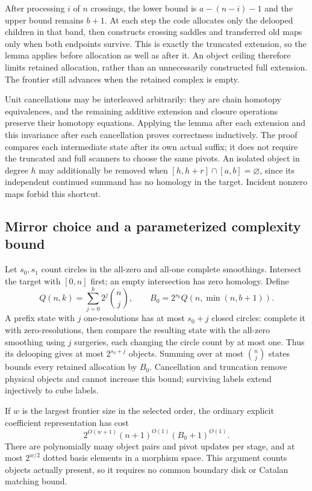 After processing $i$ of $n$ crossings, the lower bound is
$a-(n-i)-1$ and the upper bound remains $b+1$.
At each step the code allocates only the delooped children in that band,
then constructs crossing saddles and transferred old maps only when both
endpoints survive. This is exactly the truncated extension, so the lemma
applies before allocation as well as after it. An object ceiling therefore
limits retained allocation, rather than an unnecessarily constructed full
extension. The frontier still advances when the retained complex is empty.

Unit cancellations may be interleaved arbitrarily: they are chain homotopy
equivalences, and the remaining additive extension and closure operations
preserve their homotopy equations. Applying the lemma after each extension
and this invariance after each cancellation proves correctness inductively.
The proof compares each intermediate state after its own actual suffix;
it does not require the truncated and full scanners to choose the same
pivots. An isolated object in degree $h$ may additionally be removed when
$[h,h+r]\cap[a,b]=\varnothing$, since its independent continued summand
has no homology in the target. Incident nonzero maps forbid this shortcut.

\subsection{Mirror choice and a parameterized complexity bound}
Let $s_0,s_1$ count circles in the all-zero and all-one complete smoothings.
Intersect the target with $[0,n]$ first; an empty intersection has zero
homology. Define
\[
 Q(n,k)=\sum_{j=0}^k2^j\binom nj,\qquad
 B_0=2^{s_0}Q(n,\min(n,b+1)).
\]
A prefix state with $j$ one-resolutions has at most $s_0+j$ closed circles:
complete it with zero-resolutions, then compare the resulting state with
the all-zero smoothing using $j$ surgeries, each changing the circle count
by at most one. Thus its delooping gives at most $2^{s_0+j}$ objects.
Summing over at most $\binom nj$ states bounds every retained allocation
by $B_0$. Cancellation and truncation remove physical objects and cannot
increase this bound; surviving labels extend injectively to cube labels.

If $w$ is the largest frontier size in the selected order, the ordinary
explicit coefficient representation has cost
\[
 2^{O(w+1)}(n+1)^{O(1)}(B_0+1)^{O(1)}.
\]
There are polynomially many object pairs and pivot updates per stage, and
at most $2^{w/2}$ dotted basis elements in a morphism space. This argument
counts objects actually present, so it requires no common boundary disk
or Catalan matching bound.

